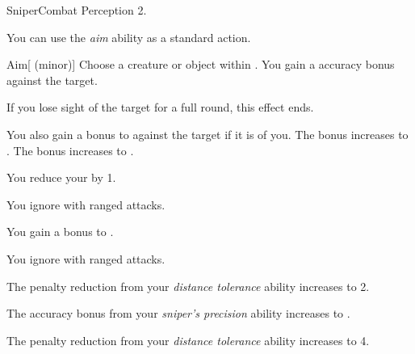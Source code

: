     \begin{feat}{Sniper}{Combat}
        \featpre Perception 2.

         You can use the \textit{aim} ability as a standard action.
        \begin{freeability}{Aim}[ (minor)]
            Choose a creature or object within .
            You gain a  accuracy bonus against the target.

            If you lose sight of the target for a full round, this effect ends.

            \rankline
             You also gain a  bonus to  against the target if it is \unaware of you.
             The  bonus increases to .
             The  bonus increases to .
        \end{freeability}

         You reduce your  by 1.

         You ignore  with ranged attacks.

         You gain a  bonus to .

         You ignore  with ranged attacks.

         The penalty reduction from your \textit{distance tolerance} ability increases to 2.

         The accuracy bonus from your \textit{sniper's precision} ability increases to .

         The penalty reduction from your \textit{distance tolerance} ability increases to 4.
    \end{feat}

